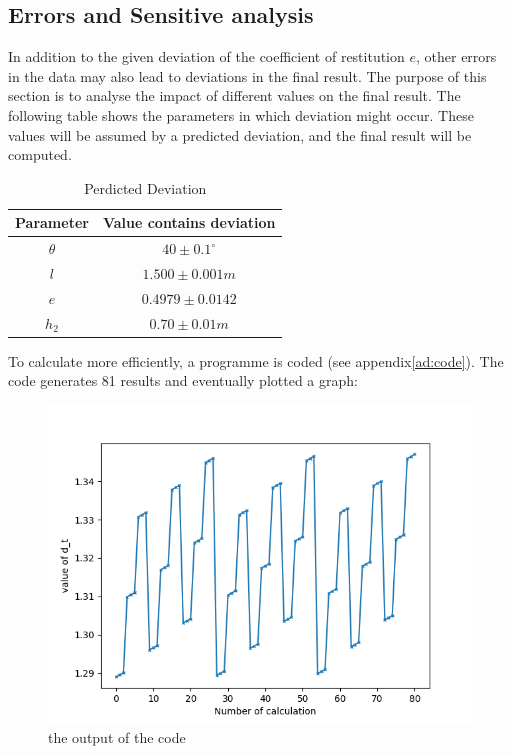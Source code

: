 \documentclass[conference]{IEEEtran}
\begin{document}
    \subsection{Errors and Sensitive analysis}
    In addition to the given deviation of the coefficient of restitution $e$, other errors in the data may also lead to deviations in the final result. The purpose of this section is to analyse the impact of different values on the final result. The following table shows the parameters in which deviation might occur. These values will be assumed by a predicted deviation, and the final result will be computed.
    \begin{table}[H]
                \caption {Perdicted Deviation} \label{tb:deviation} 
                \begin{center}
                    \begin{tabular}{cc}
                        \hline
                        Parameter & Value contains deviation \\
                        \hline
                        $\theta$     & $40\pm0.1^ \circ$     \\
                        $l$         & $1.500\pm 0.001m$     \\
                        $e$         & $0.4979 \pm 0.0142$     \\
                        $h_2$        & $0.70\pm0.01m$     \\
                        \hline
                    \end{tabular}
                \end{center}
            \end{table}
    To calculate more efficiently, a programme is coded (see appendix\ref{ad:code}). The code generates 81 results and eventually plotted a graph:
    \begin{figure}[H]
        \centering
        \includegraphics[width=0.75\linewidth]{code_output.png}
        \caption{the output of the code}
        \label{fig:code_output}
    \end{figure}
\end{document}
